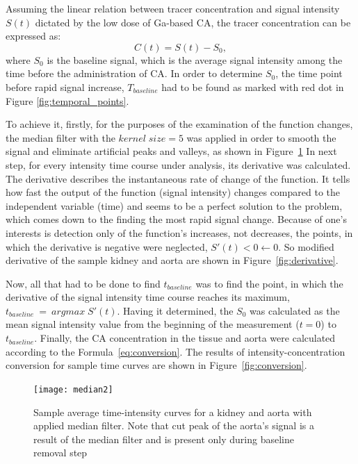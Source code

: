 Assuming the linear relation between tracer concentration and signal intensity $S(t)$ dictated by the low dose of Ga-based CA, the tracer concentration can be expressed as:
\begin{equation}
	\label{eq:conversion}
	C(t) = S(t)-S_0,
\end{equation}
where $S_0$ is the baseline signal, which is the average signal intensity among the time before the administration of CA. 
In order to determine $S_0$, the time point before rapid signal increase, $T_{baseline}$ had to be found  as marked with red dot in Figure \ref{fig:temporal_points}.

To achieve it, firstly, for the purposes of the examination of the function changes, the median filter  with the $kernel\;size = 5$ was applied in order to smooth the signal and eliminate artificial  peaks and valleys, as shown in Figure~\ref{fig:median}  
In next step, for every intensity time course under analysis, its derivative was calculated. The derivative describes the instantaneous rate of change of the function. It tells how fast the output of the function (signal intensity) changes compared to the independent variable (time) \cite{calculus} and seems to be a perfect solution to the problem, which comes down to the finding the most rapid signal change. 
Because of one's interests is detection only of the function's increases, not decreases, the points, in which the derivative is negative were neglected, $S'(t)<0\leftarrow0$. So modified derivative of the sample kidney and aorta are shown in Figure~\ref{fig:derivative}.

Now, all that had to be done to find $t_{baseline}$ was to find the point, in which the derivative of the signal intensity time course reaches its maximum, $t_{baseline}~=~argmax\;S'(t)$. Having it determined, the $S_0$ was calculated as the mean signal intensity value from the beginning of the measurement ($t=0$) to $t_{baseline}$. Finally, the CA concentration in the tissue and aorta were calculated according to the Formula~\ref{eq:conversion}. The results of intensity-concentration conversion for sample time curves are shown in Figure~\ref{fig:conversion}. 
\begin{figure}[H]
	\centering
	\texttt{[image: median2]}
\caption[Sample average time-intensity curves for a kidney and aorta with applied median filter]{Sample average time-intensity curves for a kidney and aorta with applied median filter. Note that cut peak of the aorta's signal is a result of the median filter and is present only during baseline removal step}
\label{fig:median}
\end{figure}

